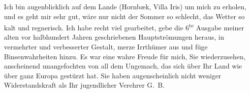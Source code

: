 \begin{ledgroupsized}[t]{13cm}
           \pstart
           Ich bin augenblicklich auf dem Lande (Hornbæk,
                        Villa Iris) um mich zu erholen, und es
                    geht mir sehr gut, wäre nur nicht der Sommer so schlecht, das Wetter so kalt und
                    regnerisch. Ich habe recht viel gearbeitet, gebe die 6\textsuperscript{te} Ausgabe meiner alten vor halbhundert Jahren geschriebenen Hauptströmungen heraus, in vermehrter und
                    verbesserter Gestalt, merze {\pb}Irrthümer aus und füge Binsenwahrheiten hinzu.\pend
           \pstart
           Es war eine wahre Freude für mich, Sie wiederzusehen, anscheinend unangefochten
                    von all dem Ungemach, das sich über Ihr Land wie über ganz Europa gestürzt hat. Sie haben augenscheinlich nicht weniger
                    Widerstandskraft als Ihr jugendlicher Verehrer\pend
           \pstart \spacefill\mbox{G. B.}\pend{}\pstart
           \noindent{}\label{T_L02401_1v}\label{T_L02401_1h}\pend
                     \endnumbering{}\end{ledgroupsized}  \newcommand{\dateiname}{L02401}\newcommand{\titel}{Georg Brandes an Arthur Schnitzler, 11. 6. 1923}\newcommand{\editorInnen}{Martin Anton Müller und Gerd-Hermann Susen}
            \footnotesize
\begin{ledgroupsized}[t]{11.5cm}
\end{ledgroupsized}
         
      